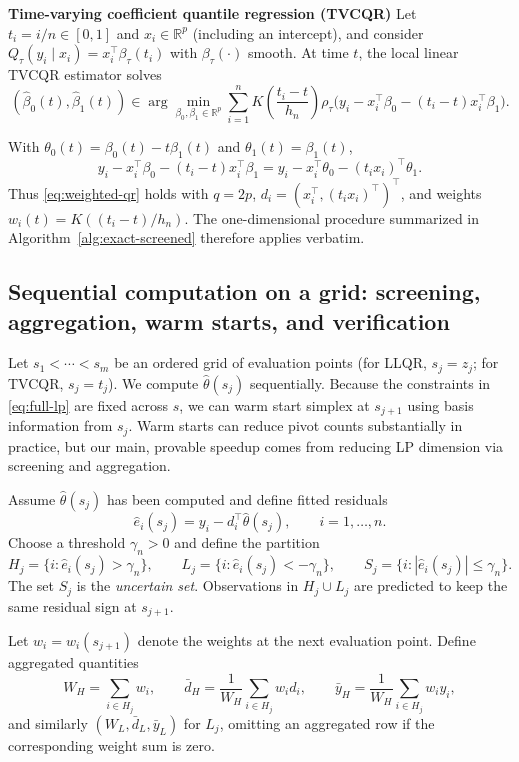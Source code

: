\documentclass[lineno]{biometrika}
\begin{document}
\textbf{Time-varying coefficient quantile regression (TVCQR)}
Let $t_i=i/n\in[0,1]$ and $x_i\in\mathbb R^p$ (including an intercept), and consider $Q_\tau(y_i\mid x_i)=x_i^\top\beta_\tau(t_i)$
with $\beta_\tau(\cdot)$ smooth. At time $t$, the local linear TVCQR estimator solves
\begin{equation}\label{eq:TVCQR}
    (\hat\beta_0(t),\hat\beta_1(t))\in
\arg\min_{\beta_0,\beta_1\in\mathbb R^p}\sum_{i=1}^n
K \left(\frac{t_i-t}{h_n}\right)\rho_\tau \bigl(y_i-x_i^\top\beta_0-(t_i-t)x_i^\top\beta_1\bigr).
\end{equation}

With $\theta_0(t)=\beta_0(t)-t\beta_1(t)$ and $\theta_1(t)=\beta_1(t)$,
\[
y_i-x_i^\top\beta_0-(t_i-t)x_i^\top\beta_1
=
y_i-x_i^\top\theta_0-(t_i x_i)^\top\theta_1.
\]
Thus \eqref{eq:weighted-qr} holds with $q=2p$, $d_i=(x_i^\top,(t_i x_i)^\top)^\top$, and weights $w_i(t)=K((t_i-t)/h_n)$.
The one-dimensional procedure summarized in Algorithm~\ref{alg:exact-screened} therefore applies verbatim.

\subsection{Sequential computation on a grid: screening, aggregation, warm starts, and verification}

Let $s_1<\cdots<s_m$ be an ordered grid of evaluation points (for LLQR, $s_j=z_j$; for TVCQR, $s_j=t_j$). We compute
$\hat\theta(s_j)$ sequentially. Because the constraints in \eqref{eq:full-lp} are fixed across $s$, we can warm start simplex
at $s_{j+1}$ using basis information from $s_j$. Warm starts can reduce pivot counts substantially in practice, but our main,
provable speedup comes from reducing LP dimension via screening and aggregation.

Assume $\hat\theta(s_j)$ has been computed and define fitted residuals
\[
\hat e_i(s_j)=y_i-d_i^\top\hat\theta(s_j),\qquad i=1,\ldots,n.
\]
Choose a threshold $\gamma_n>0$ and define the partition
\begin{equation}
H_j=\{i:\hat e_i(s_j)>\gamma_n\},\qquad
L_j=\{i:\hat e_i(s_j)<-\gamma_n\},\qquad
S_j=\{i:|\hat e_i(s_j)|\le \gamma_n\}.
\label{eq:partition}
\end{equation}
The set $S_j$ is the \emph{uncertain set}. Observations in $H_j\cup L_j$ are predicted to keep the same residual sign at $s_{j+1}$.

Let $w_i=w_i(s_{j+1})$ denote the weights at the next evaluation point. Define aggregated quantities
\[
W_H=\sum_{i\in H_j} w_i,\qquad
\bar d_H=\frac{1}{W_H}\sum_{i\in H_j} w_i d_i,\qquad
\bar y_H=\frac{1}{W_H}\sum_{i\in H_j} w_i y_i,
\]
and similarly $(W_L,\bar d_L,\bar y_L)$ for $L_j$, omitting an aggregated row if the corresponding weight sum is zero.
\end{document}
